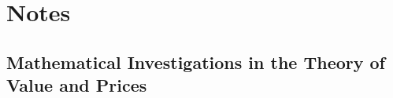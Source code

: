 \chapter{Notes}

\section{Mathematical Investigations in the Theory of Value and Prices \cite{Fisher}}